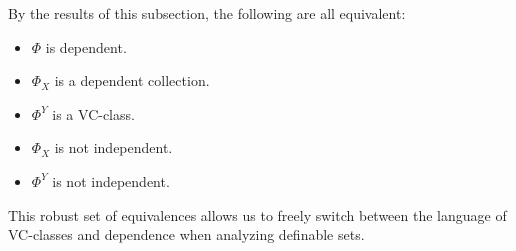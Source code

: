 By the results of this subsection, the following are all equivalent:
\begin{itemize}
    \item $\Phi$ is dependent.
    \item $\Phi_X$ is a dependent collection.
    \item $\Phi^Y$ is a VC-class.
    \item $\Phi_X$ is not independent.
    \item $\Phi^Y$ is not independent.
\end{itemize}
This robust set of equivalences allows us to freely switch between the language of VC-classes and dependence when analyzing definable sets.
